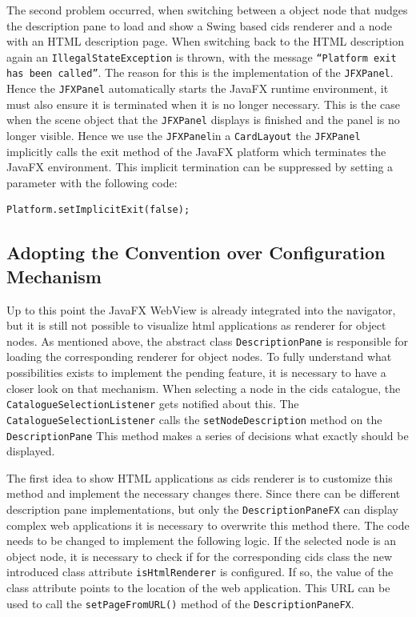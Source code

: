 The second problem occurred, when switching between a object node that nudges the description pane to load and show a Swing based cids renderer and a node with an HTML description page.
When switching back to the HTML description again an \texttt{IllegalStateException} is thrown, with the message \texttt{\enquote{Platform exit has been called}}.
The reason for this is the implementation of the \texttt{JFXPanel}.
Hence the \texttt{JFXPanel} automatically starts the JavaFX runtime environment, it must also ensure it is terminated when it is no longer necessary.
This is the case when the scene object that the \texttt{JFXPanel} displays is finished and the panel is no longer visible.
Hence we use the \texttt{JFXPanel}in a \texttt{CardLayout} the \texttt{JFXPanel} implicitly calls the exit method of the JavaFX platform which terminates the JavaFX environment.
This implicit termination can be suppressed by setting a parameter with the following code:

\begin{lstlisting}[label=implicit_exit,caption=Disable JavaFX implicit exit]
Platform.setImplicitExit(false);
\end{lstlisting}

\subsection{Adopting the Convention over Configuration Mechanism}

Up to this point the JavaFX WebView is already integrated into the navigator, but it is still not possible to visualize html applications as renderer for object nodes.
As mentioned above, the abstract class \texttt{DescriptionPane} is responsible for loading the corresponding renderer for object nodes.
To fully understand what possibilities exists  to implement the pending feature, it is necessary to have a closer look on that mechanism.
When selecting a node in the cids catalogue, the \texttt{CatalogueSelectionListener} gets notified about this.
The \texttt{CatalogueSelectionListener} calls the \texttt{setNodeDescription} method on the \texttt{DescriptionPane}
This method makes a series of decisions what exactly should be displayed.
 
The first idea to show HTML applications as cids renderer is to customize this method and implement the necessary changes there.
Since there can be different description pane implementations, but only the \texttt{DescriptionPaneFX} can display complex web applications it is necessary to overwrite this method there.
The code needs to be changed to implement the following logic.
If the selected node is an object node, it is necessary to check if for the corresponding cids class the new introduced class attribute \texttt{isHtmlRenderer} is configured. 
If so, the value of the class attribute  points to the location of the web application.
This URL can be used to call the \texttt{setPageFromURL()} method of the \texttt{DescriptionPaneFX}.

